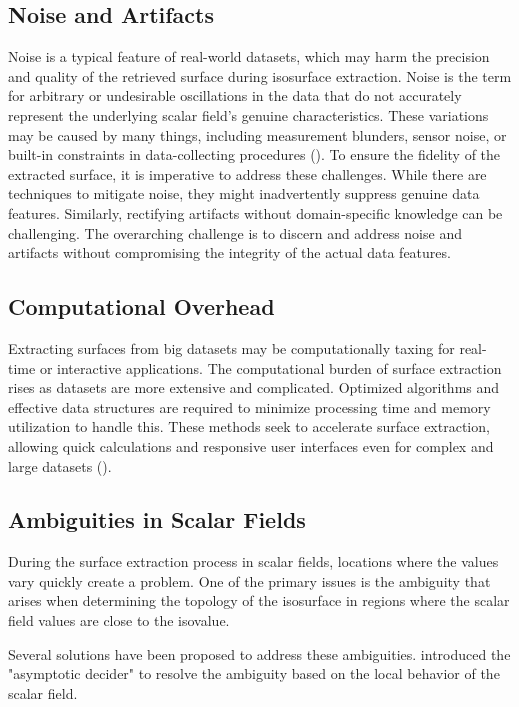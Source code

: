 \subsection{Noise and Artifacts}
Noise is a typical feature of real-world datasets, which may harm the precision and quality of the retrieved surface during isosurface extraction. Noise is the term for arbitrary or undesirable oscillations in the data that do not accurately represent the underlying scalar field's genuine characteristics. These variations may be caused by many things, including measurement blunders, sensor noise, or built-in constraints in data-collecting procedures (\cite{Savchenko_1995}).
To ensure the fidelity of the extracted surface, it is imperative to address these challenges. While there are techniques to mitigate noise, they might inadvertently suppress genuine data features. Similarly, rectifying artifacts without domain-specific knowledge can be challenging. The overarching challenge is to discern and address noise and artifacts without compromising the integrity of the actual data features.

\subsection{Computational Overhead}
Extracting surfaces from big datasets may be computationally taxing for real-time or interactive applications. The computational burden of surface extraction rises as datasets are more extensive and complicated. Optimized algorithms and effective data structures are required to minimize processing time and memory utilization to handle this. These methods seek to accelerate surface extraction, allowing quick calculations and responsive user interfaces even for complex and large datasets (\cite{Lewiner_2003}).

\subsection{Ambiguities in Scalar Fields}
During the surface extraction process in scalar fields, locations where the values vary quickly create a problem. One of the primary issues is the ambiguity that arises when determining the topology of the isosurface in regions where the scalar field values are close to the isovalue.

Several solutions have been proposed to address these ambiguities. \cite{Nielson_1991} introduced the "asymptotic decider" to resolve the ambiguity based on the local behavior of the scalar field.

